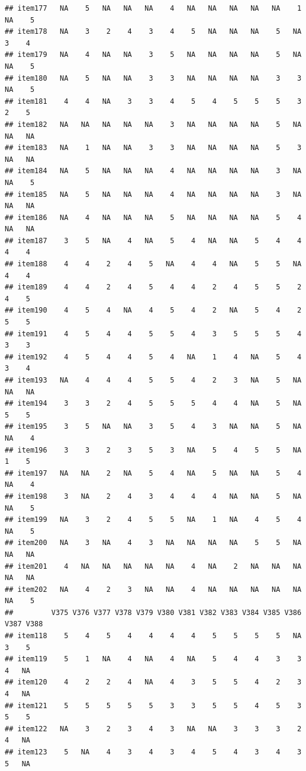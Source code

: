 \documentclass[
  man]{apa6}
\begin{document}
\begin{verbatim}
## item177   NA    5   NA   NA   NA    4   NA   NA   NA   NA   NA    1   NA    5
## item178   NA    3    2    4    3    4    5   NA   NA   NA    5   NA    3    4
## item179   NA    4   NA   NA    3    5   NA   NA   NA   NA    5   NA   NA    5
## item180   NA    5   NA   NA    3    3   NA   NA   NA   NA    3    3   NA    5
## item181    4    4   NA    3    3    4    5    4    5    5    5    3    2    5
## item182   NA   NA   NA   NA   NA    3   NA   NA   NA   NA    5   NA   NA   NA
## item183   NA    1   NA   NA    3    3   NA   NA   NA   NA    5    3   NA   NA
## item184   NA    5   NA   NA   NA    4   NA   NA   NA   NA    3   NA   NA    5
## item185   NA    5   NA   NA   NA    4   NA   NA   NA   NA    3   NA   NA   NA
## item186   NA    4   NA   NA   NA    5   NA   NA   NA   NA    5    4   NA   NA
## item187    3    5   NA    4   NA    5    4   NA   NA    5    4    4    4    4
## item188    4    4    2    4    5   NA    4    4   NA    5    5   NA    4    4
## item189    4    4    2    4    5    4    4    2    4    5    5    2    4    5
## item190    4    5    4   NA    4    5    4    2   NA    5    4    2    5    5
## item191    4    5    4    4    5    5    4    3    5    5    5    4    3    3
## item192    4    5    4    4    5    4   NA    1    4   NA    5    4    3    4
## item193   NA    4    4    4    5    5    4    2    3   NA    5   NA   NA   NA
## item194    3    3    2    4    5    5    5    4    4   NA    5   NA    5    5
## item195    3    5   NA   NA    3    5    4    3   NA   NA    5   NA   NA    4
## item196    3    3    2    3    5    3   NA    5    4    5    5   NA    1    5
## item197   NA   NA    2   NA    5    4   NA    5   NA   NA    5    4   NA    4
## item198    3   NA    2    4    3    4    4    4   NA   NA    5   NA   NA    5
## item199   NA    3    2    4    5    5   NA    1   NA    4    5    4   NA    5
## item200   NA    3   NA    4    3   NA   NA   NA   NA    5    5   NA   NA   NA
## item201    4   NA   NA   NA   NA   NA    4   NA    2   NA   NA   NA   NA   NA
## item202   NA    4    2    3   NA   NA    4   NA   NA   NA   NA   NA   NA    5
##         V375 V376 V377 V378 V379 V380 V381 V382 V383 V384 V385 V386 V387 V388
## item118    5    4    5    4    4    4    4    5    5    5    5   NA    3    5
## item119    5    1   NA    4   NA    4   NA    5    4    4    3    3    4   NA
## item120    4    2    2    4   NA    4    3    5    5    4    2    3    4   NA
## item121    5    5    5    5    5    3    3    5    5    4    5    3    5    5
## item122   NA    3    2    3    4    3   NA   NA    3    3    3    2    4   NA
## item123    5   NA    4    3    4    3    4    5    4    3    4    3    5   NA

\end{verbatim}
\end{document}
